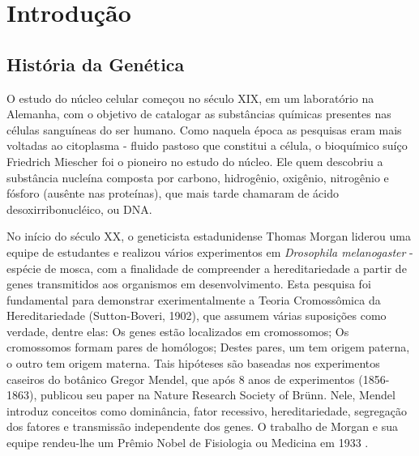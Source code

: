 \chapter{Introdução}

\section{História da Genética}

\indent O estudo do núcleo celular começou no século XIX, em um laboratório na Alemanha, com o objetivo de catalogar as substâncias químicas presentes nas células sanguíneas do ser humano. Como naquela época as pesquisas eram mais voltadas ao citoplasma - fluido pastoso que constitui a célula, o bioquímico suíço Friedrich Miescher foi o pioneiro no estudo do núcleo. Ele quem descobriu a substância nucleína composta por carbono, hidrogênio, oxigênio, nitrogênio e fósforo (ausênte nas proteínas), que mais tarde chamaram de ácido desoxirribonucléico, ou DNA.

\indent No início do século XX, o geneticista estadunidense Thomas Morgan liderou uma equipe de estudantes e realizou vários experimentos em \textit{Drosophila melanogaster} - espécie de mosca, com a finalidade de compreender a hereditariedade a partir de genes transmitidos aos organismos em desenvolvimento. Esta pesquisa foi fundamental para demonstrar exerimentalmente a Teoria Cromossômica da Hereditariedade (Sutton-Boveri, 1902), que assumem várias suposições como verdade, dentre elas: Os genes estão localizados em cromossomos; Os cromossomos formam pares de homólogos; Destes pares, um tem origem paterna, o outro tem origem materna. Tais hipóteses são baseadas nos experimentos caseiros do botânico Gregor Mendel, que após 8 anos de experimentos (1856-1863), publicou seu paper na Nature Research Society of Brünn. Nele, Mendel introduz conceitos como dominância, fator recessivo, hereditariedade, segregação dos fatores e transmissão independente dos genes. O trabalho de Morgan e sua equipe rendeu-lhe um Prêmio Nobel de Fisiologia ou Medicina em 1933 \cite{violinist12}.

